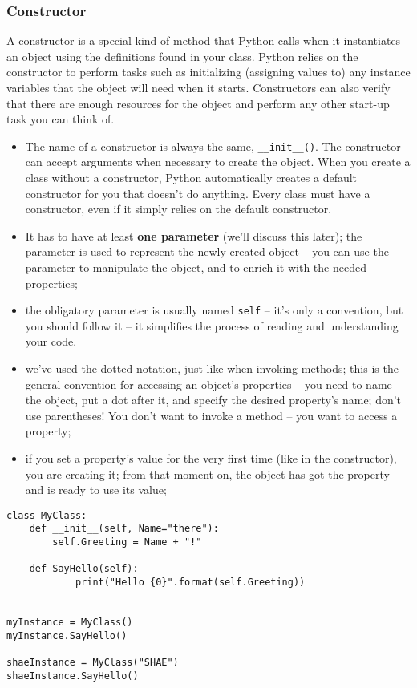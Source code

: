 \documentclass[11pt]{article}
\begin{document}
\subsubsection{Constructor}
\label{sec:org1b1656a}
A constructor is a special kind of method that Python calls when it
instantiates an object using the definitions found in your
class. Python relies on the constructor to perform tasks such as
initializing (assigning values to) any instance variables that the
object will need when it starts. Constructors can also verify that
there are enough resources for the object and perform any other
start-up task you can think of.

\begin{itemize}
\item The name of a constructor is always the same, \texttt{\_\_init\_\_()}. The
constructor can accept arguments when necessary to create the
object. When you create a class without a constructor, Python
automatically creates a default constructor for you that doesn’t do
anything. Every class must have a constructor, even if it simply
relies on the default constructor.
\item It has to have at least \textbf{one parameter} (we’ll discuss this later);
the parameter is used to represent the newly created object – you
can use the parameter to manipulate the object, and to enrich it
with the needed properties;
\item the obligatory parameter is usually named \texttt{self} – it’s only a
convention, but you should follow it – it simplifies the process of
reading and understanding your code.
\item we’ve used the dotted notation, just like when invoking methods;
this is the general convention for accessing an object’s properties
– you need to name the object, put a dot after it, and specify the
desired property’s name; don’t use parentheses! You don’t want to
invoke a method – you want to access a property;
\item if you set a property’s value for the very first time (like in the
constructor), you are creating it; from that moment on, the object
has got the property and is ready to use its value;
\end{itemize}

\begin{verbatim}
class MyClass:
    def __init__(self, Name="there"):
        self.Greeting = Name + "!"

    def SayHello(self):
            print("Hello {0}".format(self.Greeting))


myInstance = MyClass()
myInstance.SayHello()

shaeInstance = MyClass("SHAE")
shaeInstance.SayHello()
\end{verbatim}
\end{document}
